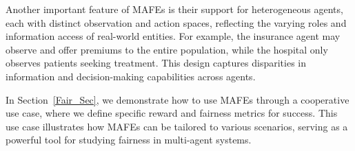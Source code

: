 Another important feature of MAFEs is their support for heterogeneous agents, each with distinct observation and action spaces, reflecting the varying roles and information access of real-world entities. For example, the insurance agent may observe and offer premiums to the entire population, while the hospital only observes patients seeking treatment. This design captures disparities in information and decision-making capabilities across agents.

In Section~\ref{Fair_Sec}, we demonstrate how to use MAFEs through a cooperative use case, where we define specific reward and fairness metrics for success.
This use case illustrates how MAFEs can be tailored to various scenarios, serving as a powerful tool for studying fairness in multi-agent systems.